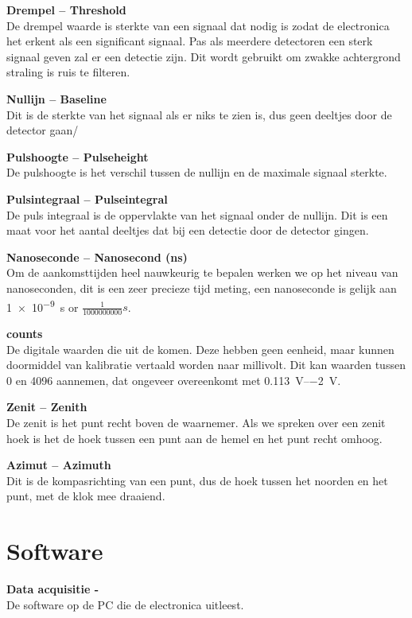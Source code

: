 \textbf{Drempel -- Threshold} \\
De drempel waarde is sterkte van een signaal dat nodig is zodat de
\hisparc electronica het erkent als een significant signaal. Pas als
meerdere detectoren een sterk signaal geven zal er een detectie zijn.
Dit wordt gebruikt om zwakke achtergrond straling is ruis te filteren.

\textbf{Nullijn -- Baseline} \\
Dit is de sterkte van het signaal als er niks te zien is, dus geen
deeltjes door de detector gaan/

\textbf{Pulshoogte -- Pulseheight} \\
De pulshoogte is het verschil tussen de nullijn en de maximale signaal
sterkte.

\textbf{Pulsintegraal -- Pulseintegral} \\
De puls integraal is de oppervlakte van het signaal onder de nullijn.
Dit is een maat voor het aantal deeltjes dat bij een detectie door de
detector gingen.

\textbf{Nanoseconde -- Nanosecond (ns)} \\
Om de aankomsttijden heel nauwkeurig te bepalen werken we op het niveau
van nanoseconden, dit is een zeer precieze tijd meting, een nanoseconde
is gelijk aan \SI{1e-9}{\second} or $\frac{1}{1000000000} s$.

\textbf{\adc counts} \\
De digitale waarden die uit de \adc komen. Deze hebben geen eenheid,
maar kunnen doormiddel van kalibratie vertaald worden naar millivolt.
Dit kan waarden tussen 0 en 4096 aannemen, dat ongeveer overeenkomt met
\SIrange{+0.113}{-2}{\volt}.

\textbf{Zenit -- Zenith} \\
De zenit is het punt recht boven de waarnemer. Als we spreken over een
zenit hoek is het de hoek tussen een punt aan de hemel en het punt recht
omhoog.

\textbf{Azimut -- Azimuth} \\
Dit is de kompasrichting van een punt, dus de hoek tussen het noorden en
het punt, met de klok mee draaiend.


\section{Software}

\textbf{Data acquisitie - \hisparc\daq} \\
De software op de \hisparc PC die de \hisparc electronica uitleest.


